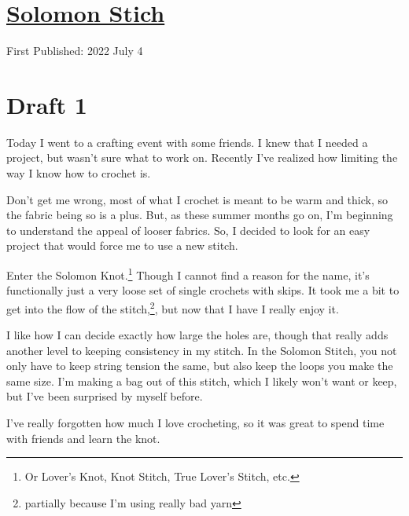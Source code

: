 \documentclass[12pt]{article}[titlepage]
\newcommand{\1}{\={a}}
\newcommand{\2}{\={e}}
\newcommand{\3}{\={\i}}
\newcommand{\4}{\=o}
\newcommand{\5}{\=u}
\newcommand{\6}{\={A}}
\renewcommand{\,}{\textsuperscript{,}}
\begin{document}
\doublespacing
\section{\href{solomon-crochet.html}{Solomon Stich}}
First Published: 2022 July 4
\section{Draft 1}
Today I went to a crafting event with some friends.
I knew that I needed a project, but wasn't sure what to work on.
Recently I've realized how limiting the way I know how to crochet is.

Don't get me wrong, most of what I crochet is meant to be warm and thick, so the fabric being so is a plus.
But, as these summer months go on, I'm beginning to understand the appeal of looser fabrics.
So, I decided to look for an easy project that would force me to use a new stitch.

Enter the Solomon Knot.\footnote{Or Lover's Knot, Knot Stitch, True Lover's Stitch, etc.}
Though I cannot find a reason for the name, it's functionally just a very loose set of single crochets with skips.
It took me a bit to get into the flow of the stitch,\footnote{partially because I'm using really bad yarn}, but now that I have I really enjoy it.

I like how I can decide exactly how large the holes are, though that really adds another level to keeping consistency in my stitch.
In the Solomon Stitch, you not only have to keep string tension the same, but also keep the loops you make the same size.
I'm making a bag out of this stitch, which I likely won't want or keep, but I've been surprised by myself before.

I've really forgotten how much I love crocheting, so it was great to spend time with friends and learn the knot.
\end{document}
